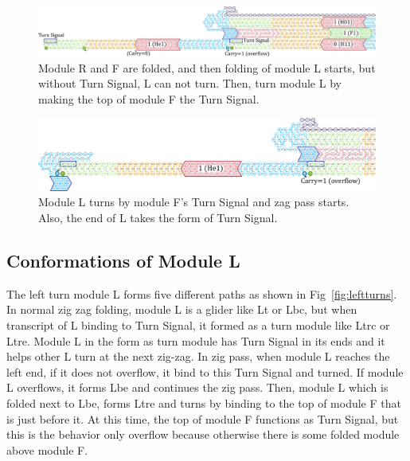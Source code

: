 \documentclass[runningheads]{llncs}
\begin{document}
\begin{figure}[tb]
\centering
\includegraphics[width=\linewidth]{fig/svg/CounterEx17_1.pdf}
\caption{
Module R and F are folded, and then folding of module L starts, but without Turn Signal, L can not turn.
Then, turn module L by making the top of module F the Turn Signal.
}
\label{fig:overflowex4}
\end{figure}

\begin{figure}[tb]
\centering
\includegraphics[width=\linewidth]{fig/svg/CounterEx18_1.pdf}
\caption{
Module L turns by module F's Turn Signal and zag pass starts.
Also, the end of L takes the form of Turn Signal.
}
\label{fig:overflowex5}
\end{figure}

\subsection{Conformations of Module L}
The left turn module L forms five different paths as shown in Fig~\ref{fig:leftturns}.
In normal zig zag folding, module L is a glider like Lt or Lbc, but when transcript of L binding to Turn Signal, it formed as a turn module like Ltrc or Ltre.
Module L in the form as turn module has Turn Signal in its ends and it helps other L turn at the next zig-zag.
In zig pass, when module L reaches the left end, if it does not overflow, it bind to this Turn Signal and turned.
If module L overflows, it forms Lbe and continues the zig pass.
Then, module L which is folded next to Lbe, forms Ltre and turns by binding to the top of module F that is just before it.
At this time, the top of module F functions as Turn Signal, but this is the behavior only overflow because otherwise there is some folded module above module F.
\end{document}
